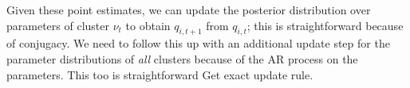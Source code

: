 Given these point estimates, we can update the posterior distribution over parameters of cluster $\nu_t$ to obtain $q_{i,t+1}$ from $q_{i,t}$; this
is straightforward because of conjugacy. 
We need to follow this up with an additional update step for the parameter distributions of \emph{all} clusters because of the AR process on the parameters.
This too is straightforward {\color{red} Get exact update rule}.
